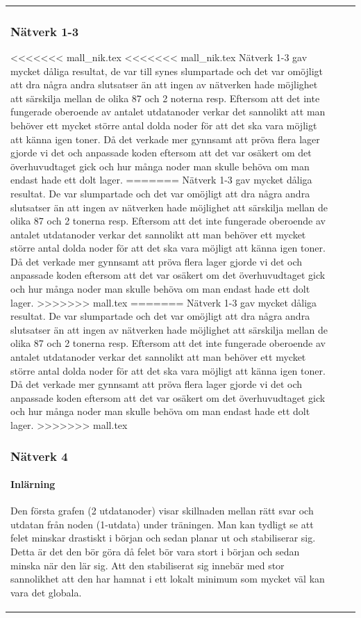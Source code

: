\documentclass[a4paper,10pt]{article}
\begin{document}
{\begin{tabular}{ |l | l | l| }
\begin{centering}
\begin{centering}
\subsubsection{Nätverk 1-3}
<<<<<<< mall_nik.tex
<<<<<<< mall_nik.tex
Nätverk 1-3 gav mycket dåliga resultat, de var till synes slumpartade och det var omöjligt att dra några andra slutsatser än att ingen av nätverken hade möjlighet att särskilja mellan de olika 87 och 2 noterna resp. Eftersom att det inte fungerade oberoende av antalet utdatanoder verkar det sannolikt att man behöver ett mycket större antal dolda noder för att det ska vara möjligt att känna igen toner. Då det verkade mer gynnsamt att pröva flera lager gjorde vi det och anpassade koden eftersom att det var osäkert om det överhuvudtaget gick och hur många noder man skulle behöva om man endast hade ett dolt lager.
=======
Nätverk 1-3 gav mycket dåliga resultat. De var slumpartade och det var omöjligt att dra några andra slutsatser än att ingen av nätverken hade möjlighet att särskilja mellan de olika 87 och 2 tonerna resp. Eftersom att det inte fungerade oberoende av antalet utdatanoder verkar det sannolikt att man behöver ett mycket större antal dolda noder för att det ska vara möjligt att känna igen toner. Då det verkade mer gynnsamt att pröva flera lager gjorde vi det och anpassade koden eftersom att det var osäkert om det överhuvudtaget gick och hur många noder man skulle behöva om man endast hade ett dolt lager.
>>>>>>> mall.tex
=======
Nätverk 1-3 gav mycket dåliga resultat. De var slumpartade och det var omöjligt att dra några andra slutsatser än att ingen av nätverken hade möjlighet att särskilja mellan de olika 87 och 2 tonerna resp. Eftersom att det inte fungerade oberoende av antalet utdatanoder verkar det sannolikt att man behöver ett mycket större antal dolda noder för att det ska vara möjligt att känna igen toner. Då det verkade mer gynnsamt att pröva flera lager gjorde vi det och anpassade koden eftersom att det var osäkert om det överhuvudtaget gick och hur många noder man skulle behöva om man endast hade ett dolt lager.
>>>>>>> mall.tex
\subsubsection{Nätverk 4}
\paragraph{Inlärning}\hspace{0pt}
Den första grafen (2 utdatanoder) visar skillnaden mellan rätt svar och utdatan från noden (1-utdata) under träningen. Man kan tydligt se att felet minskar drastiskt i början och sedan planar ut och stabiliserar sig. Detta är det den bör göra då felet bör vara stort i början och sedan minska när den lär sig. Att den stabiliserat sig innebär med stor sannolikhet att den har hamnat i ett lokalt minimum som mycket väl kan vara det globala. 

\end{centering}
\end{centering}
\end{tabular}}
\end{document}
